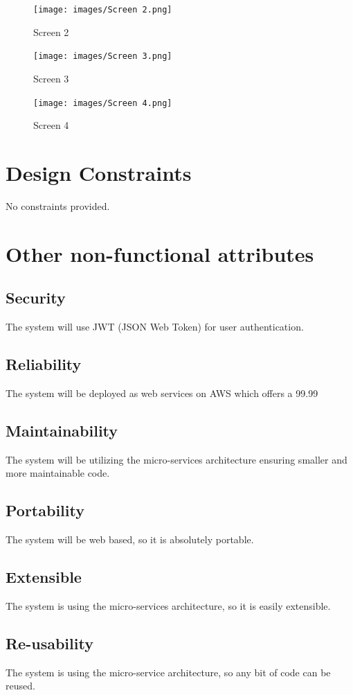 \begin{figure}[H]
    \texttt{[image: images/Screen 2.png]}
    \caption{Screen 2}
\end{figure}

\begin{figure}[H]
    \texttt{[image: images/Screen 3.png]}
    \caption{Screen 3}
\end{figure}
\begin{figure}[H]
    \texttt{[image: images/Screen 4.png]}
    \caption{Screen 4}
\end{figure}

\section{Design Constraints}
No constraints provided.

\section{Other non-functional attributes}
\subsection {Security}
The system will use JWT (JSON Web Token) for user authentication.
\subsection {Reliability}
The system will be deployed as web services on AWS which offers a 99.99\
\subsection {Maintainability}
The system will be utilizing the micro-services architecture ensuring smaller and more maintainable code.
\subsection {Portability}
The system will be web based, so it is absolutely portable.
\subsection {Extensible}
The system is using the micro-services architecture, so it is easily extensible.
\subsection {Re-usability}
The system is using the micro-service architecture, so any bit of code can be reused.

